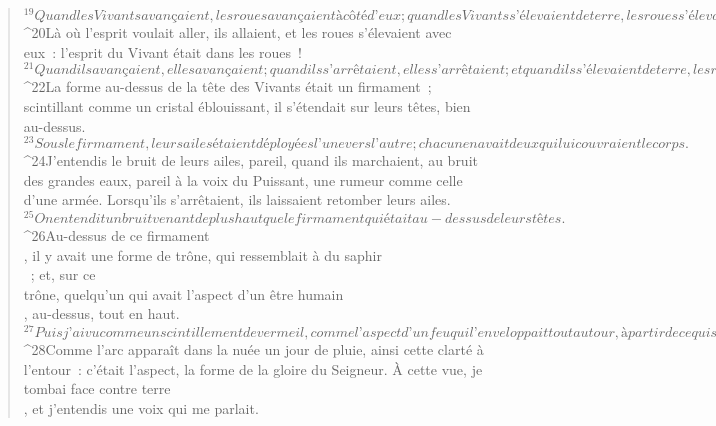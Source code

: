\begin{verse}
${}^{19}Quand les Vivants avançaient, les roues avançaient à côté d’eux ; quand les Vivants s’élevaient de terre, les roues s’élevaient. 
${}^{20}Là où l’esprit voulait aller, ils allaient, et les roues s’élevaient avec eux : l’esprit du Vivant était dans les roues ! 
${}^{21}Quand ils avançaient, elles avançaient ; quand ils s’arrêtaient, elles s’arrêtaient ; et quand ils s’élevaient de terre, les roues s’élevaient avec eux : l’esprit du Vivant était dans les roues !
${}^{22}La forme au-dessus de la tête des Vivants était un firmament ; scintillant comme un cristal éblouissant, il s’étendait sur leurs têtes, bien au-dessus. 
${}^{23}Sous le firmament, leurs ailes étaient déployées l’une vers l’autre ; chacun en avait deux qui lui couvraient le corps.
${}^{24}J’entendis le bruit de leurs ailes, pareil, quand ils marchaient, au bruit des grandes eaux, pareil à la voix du Puissant, une rumeur comme celle d’une armée. Lorsqu’ils s’arrêtaient, ils laissaient retomber leurs ailes. 
${}^{25}On entendit un bruit venant de plus haut que le firmament qui était au-dessus de leurs têtes. 
${}^{26}Au-dessus de ce firmament\\, il y avait une forme de trône, qui ressemblait à du saphir\\ ; et, sur ce\\trône, quelqu’un qui avait l’aspect d’un être humain\\, au-dessus, tout en haut. 
${}^{27}Puis j’ai vu comme un scintillement de vermeil, comme l’aspect d’un feu qui l’enveloppait tout autour, à partir de ce qui semblait être ses reins et au-dessus. À partir de ce qui semblait être ses reins et au-dessous, j’ai vu comme l’aspect d’un feu et, autour, une clarté. 
${}^{28}Comme l’arc apparaît dans la nuée un jour de pluie, ainsi cette clarté à l’entour : c’était l’aspect, la forme de la gloire du Seigneur. À cette vue, je tombai face contre terre\\, et j’entendis une voix qui me parlait.
      

\end{verse}
